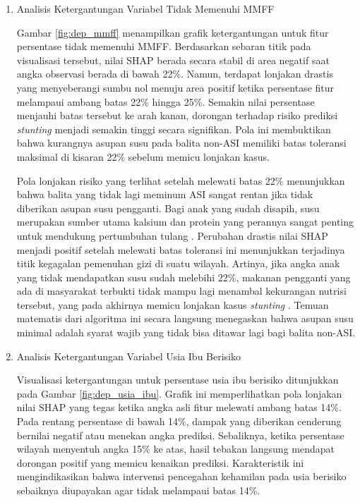 \newpage
\begin{enumerate}[listparindent=\parindent]
    \item Analisis Ketergantungan Variabel Tidak Memenuhi MMFF
    
    Gambar \ref{fig:dep_mmff} menampilkan grafik ketergantungan untuk fitur persentase tidak memenuhi MMFF. Berdasarkan sebaran titik pada visualisasi tersebut, nilai SHAP berada secara stabil di area negatif saat angka observasi berada di bawah 22\%. Namun, terdapat lonjakan drastis yang menyeberangi sumbu nol menuju area positif ketika persentase fitur melampaui ambang batas 22\% hingga 25\%. Semakin nilai persentase menjauhi batas tersebut ke arah kanan, dorongan terhadap risiko prediksi \textit{stunting} menjadi semakin tinggi secara signifikan. Pola ini membuktikan bahwa kurangnya asupan susu pada balita non-ASI memiliki batas toleransi maksimal di kisaran 22\% sebelum memicu lonjakan kasus.

    \indent Pola lonjakan risiko yang terlihat setelah melewati batas 22\% menunjukkan bahwa balita yang tidak lagi meminum ASI sangat rentan jika tidak diberikan asupan susu pengganti. Bagi anak yang sudah disapih, susu merupakan sumber utama kalsium dan protein yang perannya sangat penting untuk mendukung pertumbuhan tulang \cite{who2023complementary}. Perubahan drastis nilai SHAP menjadi positif setelah melewati batas toleransi ini menunjukkan terjadinya titik kegagalan pemenuhan gizi di suatu wilayah. Artinya, jika angka anak yang tidak mendapatkan susu sudah melebihi 22\%, makanan pengganti yang ada di masyarakat terbukti tidak mampu lagi menambal kekurangan nutrisi tersebut, yang pada akhirnya memicu lonjakan kasus \textit{stunting} \cite{beal2018review}. Temuan matematis dari algoritma ini secara langsung menegaskan bahwa asupan susu minimal adalah syarat wajib yang tidak bisa ditawar lagi bagi balita non-ASI.

    \item Analisis Ketergantungan Variabel Usia Ibu Berisiko
    
    Visualisasi ketergantungan untuk persentase usia ibu berisiko ditunjukkan pada Gambar \ref{fig:dep_usia_ibu}. Grafik ini memperlihatkan pola lonjakan nilai SHAP yang tegas ketika angka asli fitur melewati ambang batas 14\%. Pada rentang persentase di bawah 14\%, dampak yang diberikan cenderung bernilai negatif atau menekan angka prediksi. Sebaliknya, ketika persentase wilayah menyentuh angka 15\% ke atas, hasil tebakan langsung mendapat dorongan positif yang memicu kenaikan prediksi. Karakteristik ini mengindikasikan bahwa intervensi pencegahan kehamilan pada usia berisiko sebaiknya diupayakan agar tidak melampaui batas 14\%.


\end{enumerate}
